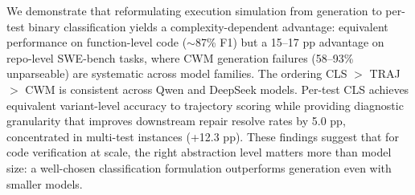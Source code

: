 \documentclass[11pt,a4paper]{article}
\begin{document}
We demonstrate that reformulating execution simulation from generation to per-test binary classification yields a complexity-dependent advantage: equivalent performance on function-level code ($\sim$87\% F1) but a 15--17 pp advantage on repo-level SWE-bench tasks, where CWM generation failures (58--93\% unparseable) are systematic across model families.
The ordering CLS $>$ TRAJ $>$ CWM is consistent across Qwen and DeepSeek models.
Per-test CLS achieves equivalent variant-level accuracy to trajectory scoring while providing diagnostic granularity that improves downstream repair resolve rates by 5.0 pp, concentrated in multi-test instances (+12.3 pp).
These findings suggest that for code verification at scale, the right abstraction level matters more than model size: a well-chosen classification formulation outperforms generation even with smaller models.



\end{document}
